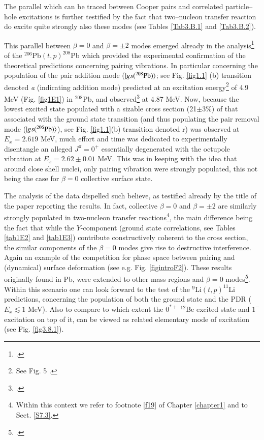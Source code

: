 \begin{subappendices}
 The parallel which can be traced between Cooper pairs and correlated particle--hole excitations is further testified by the fact that two--nucleon transfer reaction do excite quite strongly also these modes (see Tables \ref{Tab3.B.1} and \ref{Tab3.B.2}). 

This parallel between $\beta=0$ and $\beta=\pm2$ modes emerged already in the analysis\footnote{\cite{Broglia:67}.} of the $^{206}$Pb$(t,p)^{208}$Pb which provided the experimental confirmation of the theoretical predictions concerning pairing vibrations. In particular concerning the population of the pair addition mode ($|{gs(^{208}\text{Pb})} \rangle$; see Fig. \ref{fig1.1} (b) transition denoted \emph{a} (indicating addition mode)  predicted at an excitation energy\footnote{See Fig. 5 \cite{Bes:66}.} of 4.9 MeV (Fig. \ref{fig1E1}) in $^{208}$Pb, and observed\footnote{\cite{Bjerregaard:66b}.} at 4.87 MeV. Now, because the lowest excited state populated with a sizable cross section (21$\pm3\%$) of that associated with the ground state transition (and thus populating the pair removal mode ($|{gs(^{206}\text{Pb})} \rangle$), see Fig. \ref{fig1.1}(b) transition denoted r) was observed at $E_x=2.619$ MeV, much effort and time was dedicated to experimentally disentangle an alleged $J^\pi=0^+$ essentially degenerated with the octupole vibration at $E_x=2.62\pm0.01$ MeV.  This was in keeping with the idea that around close shell nuclei, only pairing vibration were strongly populated, this not being the case for $\beta=0$ collective surface state. 

The analysis of the data dispelled such believe, as testified already by the title of the paper reporting the results. In fact, collective $\beta=0$ and $\beta=\pm2$ are similarly strongly populated in two-nucleon transfer reactions\footnote{Within this context we refer to footnote \ref{f19} of Chapter \ref{chapter1} and to Sect. \ref{S7.3}.}, the main difference being the fact that while the $Y$-component (ground state correlations, see Tables \ref{tab1E2} and \ref{tab1E3}) contribute constructively coherent to the cross section, the similar components of the $\beta=0$ modes give rise to destructive interference. Again an example of the competition for phase space between pairing and (dynamical) surface deformation (see e.g. Fig. \ref{figintroF2}). These results originally found in Pb, were extended to other mass regions and $\beta=0$ modes\footnote{\cite{Broglia:71}.}. Within this scenario one can look forward to the test of the $^9$Li$(t,p)^{11}$Li predictions, concerning the population of both the ground state and the PDR ($E_x\lesssim1$ MeV). Also to compare to which extent the $0^{*+}$ $^{12}$Be excited state and $1^-$ excitation on top of it, can be viewed as related elementary mode of excitation (see Fig. \ref{fig3.8.1}).

\end{subappendices}
